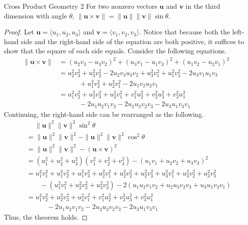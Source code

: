 \documentclass[../../../main.tex]{subfiles}
\begin{document}
\begin{theorem}{}{Cross Product Geometry 2}
For two nonzero vectors $\mathbf{u}$ and $\mathbf{v}$ in the third
dimension with angle $\theta$, $\| \mathbf{u} \times \mathbf{v} \|
= \| \mathbf{u} \| \| \mathbf{v} \| \sin\theta$.
\end{theorem}
\begin{proof}
Let $\mathbf{u} = \langle u_1, u_2, u_3 \rangle$ and
$\mathbf{v} = \langle v_1, v_2, v_3 \rangle$. Notice that because
both the left-hand side and the right-hand side of the equation
are both positive, it suffices to show that the square of each
side equals. Consider the following equations.
\begin{align*}
    \| \mathbf{u} \times \mathbf{v} \|
    &= (u_2v_3 - u_3v_2)^2 + (u_3v_1 - u_1v_3)^2
        + (u_1v_2 - u_2v_1)^2 \\
    &= u_2^2v_3^2 + u_3^2v_2^2 - 2u_2v_3u_3v_2
        + u_3^2v_1^2 + u_1^2v_3^2 - 2u_3v_1u_1v_3 \\
    &\qquad\quad+ u_1^2v_2^2 + u_2^2v_1^2 - 2u_1v_2u_2v_1 \\
    &= u_1^2v_2^2 + u_2^2v_3^2 + u_3^2v_1^2
        + v_1^2u_2^2 + v_2^2u_3^2 + v_3^2u_1^2 \\
    &\qquad\quad- 2u_1u_2v_1v_2 - 2u_2u_3v_2v_3 - 2u_3u_1v_3v_1
\end{align*}
Continuing, the right-hand side can be rearranged as the following.
\begin{align*}
    &\quad\ \| \mathbf{u} \|^2 \| \mathbf{v} \|^2 \sin^2\theta \\
    &= \| \mathbf{u} \|^2 \| \mathbf{v} \|^2
        - \| \mathbf{u} \|^2 \| \mathbf{v} \|^2 \cos^2\theta \\
    &= \| \mathbf{u} \|^2 \| \mathbf{v} \|^2
        - (\mathbf{u} \times \mathbf{v})^2 \\
    &= (u_1^2 + u_2^2 + u_3^2)(v_1^2 + v_2^2 + v_3^2)
        - (u_1v_1 + u_2v_2 + u_3v_3)^2 \\
    &= u_1^2v_1^2 + u_1^2v_2^2 + u_1^2v_3^2
        + u_2^2v_1^2 + u_2^2v_2^2 + u_2^2v_3^2
        + u_3^2v_1^2 + u_3^2v_2^2 + u_3^2v_3^2 \\
    &\qquad - (u_1^2v_1^2 + u_2^2v_2^2 + u_3^2v_3^2)
        - 2(u_1u_2v_1v_2 + u_2u_3v_2v_3 + u_3u_1v_3v_1) \\
    &= u_1^2v_2^2 + u_2^2v_3^2 + u_3^2v_1^2
        + v_1^2u_2^2 + v_2^2u_3^2 + v_3^2u_1^2 \\
    &\qquad\quad- 2u_1u_2v_1v_2 - 2u_2u_3v_2v_3 - 2u_3u_1v_3v_1
\end{align*}
Thus, the theorem holds.
\end{proof}
\end{document}
